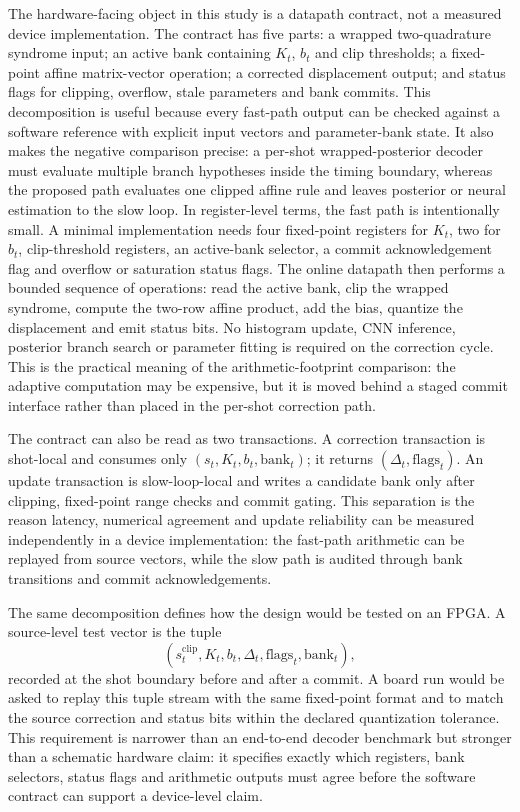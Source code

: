 \documentclass[11pt]{article}
\begin{document}
The hardware-facing object in this study is a datapath contract, not a
measured device implementation.  The contract has five parts: a wrapped
two-quadrature syndrome input; an active bank containing \(K_t\), \(b_t\) and
clip thresholds; a fixed-point affine matrix-vector operation; a corrected
displacement output; and status flags for clipping, overflow, stale parameters
and bank commits.  This decomposition is useful because every fast-path output
can be checked against a software reference with explicit input vectors and
parameter-bank state.  It also makes the negative comparison precise: a
per-shot wrapped-posterior decoder must evaluate multiple branch hypotheses
inside the timing boundary, whereas the proposed path evaluates one clipped
affine rule and leaves posterior or neural estimation to the slow loop.
In register-level terms, the fast path is intentionally small.  A minimal
implementation needs four fixed-point registers for \(K_t\), two for \(b_t\),
clip-threshold registers, an active-bank selector, a commit acknowledgement
flag and overflow or saturation status flags.  The online datapath then
performs a bounded sequence of operations: read the active bank, clip the
wrapped syndrome, compute the two-row affine product, add the bias, quantize
the displacement and emit status bits.  No histogram update, CNN inference,
posterior branch search or parameter fitting is required on the correction
cycle.  This is the practical meaning of the arithmetic-footprint comparison:
the adaptive computation may be expensive, but it is moved behind a staged
commit interface rather than placed in the per-shot correction path.

The contract can also be read as two transactions.  A correction transaction is
shot-local and consumes only \((s_t,K_t,b_t,\mathrm{bank}_t)\); it returns
\((\Delta_t,\mathrm{flags}_t)\).  An update transaction is slow-loop-local and
writes a candidate bank only after clipping, fixed-point range checks and commit
gating.  This separation is the reason latency, numerical agreement and update
reliability can be measured independently in a device implementation: the
fast-path arithmetic can be replayed from source vectors, while the slow path is
audited through bank transitions and commit acknowledgements.

The same decomposition defines how the design would be tested on an FPGA.  A
source-level test vector is the tuple
\[
    (s_t^{\mathrm{clip}},K_t,b_t,\Delta_t,\mathrm{flags}_t,\mathrm{bank}_t),
\]
recorded at the shot boundary before and after a commit.  A board run would be
asked to replay this tuple stream with the same fixed-point format and to match
the source correction and status bits within the declared quantization
tolerance.  This requirement is narrower than an end-to-end decoder benchmark
but stronger than a schematic hardware claim: it specifies exactly which
registers, bank selectors, status flags and arithmetic outputs must agree before
the software contract can support a device-level claim.
\end{document}

